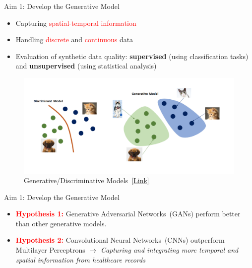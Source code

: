 \documentclass{beamer}
\begin{document}
\begin{frame}{Aim 1: Develop the Generative Model}

\begin{itemize}
  \item Capturing \textcolor{red}{spatial-temporal information}
  \item Handling \textcolor{red}{discrete} and \textcolor{red}{continuous} data
  \item Evaluation of synthetic data quality: \textbf{supervised} (using classification tasks) and \textbf{unsupervised} (using statistical analysis)
  

\end{itemize}

\begin{figure}
\includegraphics[scale=0.4]{_img/generative.png}
\caption{\label{fig:gen-model}{Generative/Discriminative Models~\href{https://medium.com/@jordi299/about-generative-and-discriminative-models-d8958b67ad32}{[Link]}}}
\end{figure}
  
\end{frame}


\begin{frame}{Aim 1: Develop the Generative Model}

\begin{itemize}
  \item \textbf{\textcolor{red}{Hypothesis 1:}} Generative Adversarial Networks~(GANs) perform better than other generative models.
  \item \textbf{\textcolor{red}{Hypothesis 2:}} Convolutional Neural Networks~(CNNs) outperform Multilayer Perceptrons $\rightarrow$ \textit{Capturing and integrating more temporal and spatial information from healthcare records}

\end{itemize}


\end{frame}
\end{document}
